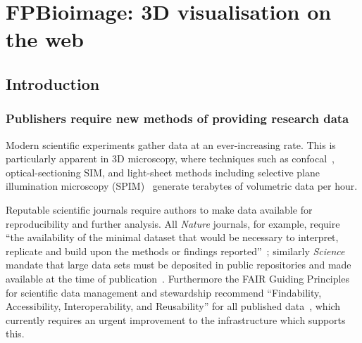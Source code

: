 \chapter{FPBioimage: 3D visualisation on the web} \label{chap:FPB}



\ifpdf
    \graphicspath{{Chapter3/Figs/Raster/}{Chapter3/Figs/PDF/}{Chapter3/Figs/}}
\else
    \graphicspath{{Chapter3/Figs/Vector/}{Chapter3/Figs/}}
\fi

%

\section{Introduction}
\subsection{Publishers require new methods of providing research data} \label{sec:introvisual}
Modern scientific experiments gather data at an ever-increasing rate.
This is particularly apparent in 3D microscopy, where techniques such as confocal~\cite{marvin1961microscopy}, optical-sectioning SIM, and light-sheet methods including selective plane illumination microscopy (SPIM)~\cite{huisken2004optical} generate terabytes of volumetric data per hour.

Reputable scientific journals require authors to make data available for reproducibility and further analysis.
All \textit{Nature} journals, for example, require ``the availability of the minimal dataset that would be necessary to interpret, replicate and build upon the methods or findings reported''~\cite{naturedata}; similarly \textit{Science} mandate that large data sets must be deposited in public repositories and made available at the time of publication~\cite{sciencedata}.
Furthermore the FAIR Guiding Principles for scientific data management and stewardship recommend ``Findability, Accessibility, Interoperability, and Reusability'' for all published data~\cite{wilkinson2016fair}, which currently requires an urgent improvement to the infrastructure which supports this.


